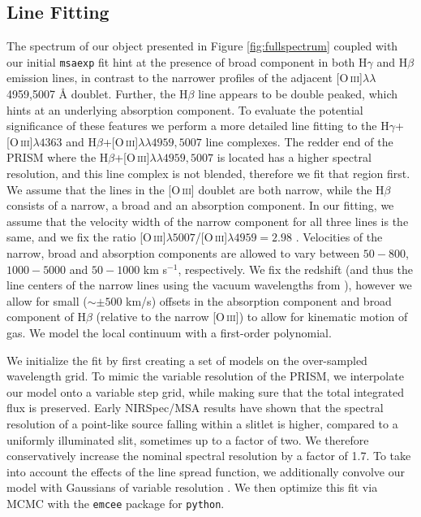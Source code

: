 \documentclass[twocolumn]{aastex7}
\newcommand{\oiii}{[O\,\textsc{iii}]}
\begin{document}
\subsection{Line Fitting}\label{sec:linefits}

The spectrum of our object presented in Figure \ref{fig:fullspectrum} coupled with our initial \texttt{msaexp} fit hint at the presence of broad component in both H$\gamma$ and H$\beta$ emission lines, in contrast to the narrower profiles of the adjacent \oiii$\lambda \lambda$4959,5007 \AA{} doublet. Further, the H$\beta$ line appears to be double peaked, which hints at an underlying absorption component. To evaluate the potential significance of these features we perform a more detailed line fitting to the H$\gamma$+\oiii$\lambda4363$ and H$\beta$+\oiii$\lambda\lambda4959,5007$ line complexes. The redder end of the PRISM where the H$\beta$+\oiii$\lambda\lambda4959,5007$ is located has a higher spectral resolution, and this line complex is not blended, therefore we fit that region first. We assume that the lines in the \oiii{} doublet are both narrow, while the H$\beta$ consists of a narrow, a broad and an absorption component. In our fitting, we assume that the velocity width of the narrow component for all three lines is the same, and we fix the ratio \oiii$\lambda5007$/\oiii$\lambda4959=2.98$ \citep{storey2000}.  Velocities of the narrow, broad and absorption components are allowed to vary between $50-800$, $1000-5000$ and $50-1000$ km s$^{-1}$, respectively. We fix the redshift (and thus the line centers of the narrow lines using the vacuum wavelengths from \citealt{vanhoof18}), however we allow for small ($\sim\pm500$ km/s) offsets in the absorption component and broad component of H$\beta$ (relative to the narrow \oiii) to allow for kinematic motion of gas. We model the local continuum with a first-order polynomial. 

We initialize the fit by first creating a set of models on the over-sampled wavelength grid. To mimic the variable resolution of the PRISM, we interpolate our model onto a variable step grid, while making sure that the total integrated flux is preserved. Early NIRSpec/MSA results \citep{degraaff23} have shown that the spectral resolution of a point-like source falling within a slitlet is higher, compared to a uniformly illuminated slit, sometimes up to a factor of two. We therefore conservatively increase the nominal spectral resolution by a factor of 1.7. To take into account the effects of the line spread function, we additionally convolve our model with Gaussians of variable resolution \citep{degraaff23,isobe23}. We then optimize this fit via MCMC with the \texttt{emcee} \citep{emcee} package for \texttt{python}. 
\end{document}

